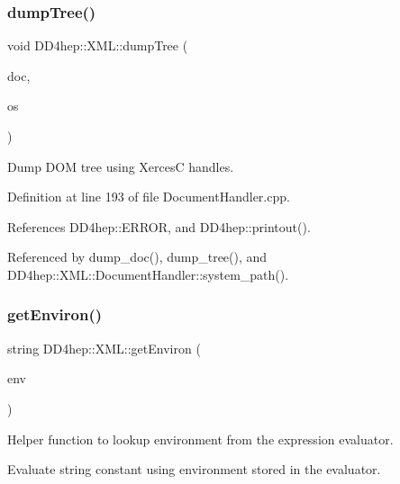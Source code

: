 \hypertarget{namespace_d_d4hep_1_1_x_m_l_a5378d08fbf2f2c9e495fc772360b62d8}{}\label{namespace_d_d4hep_1_1_x_m_l_a5378d08fbf2f2c9e495fc772360b62d8} 
\subsubsection{\texorpdfstring{dump\+Tree()}{dumpTree()}\hspace{0.1cm}{\footnotesize\ttfamily [2/2]}}
{\footnotesize\ttfamily void D\+D4hep\+::\+X\+M\+L\+::dump\+Tree (\begin{DoxyParamCaption}\item[{D\+O\+M\+Node $\ast$}]{doc,  }\item[{ostream \&}]{os }\end{DoxyParamCaption})}



Dump D\+OM tree using XercesC handles. 



Definition at line 193 of file Document\+Handler.\+cpp.



References D\+D4hep\+::\+E\+R\+R\+OR, and D\+D4hep\+::printout().



Referenced by dump\+\_\+doc(), dump\+\_\+tree(), and D\+D4hep\+::\+X\+M\+L\+::\+Document\+Handler\+::system\+\_\+path().

\hypertarget{namespace_d_d4hep_1_1_x_m_l_ab30d4d75e9d1cb30b2488b650836bdeb}{}\label{namespace_d_d4hep_1_1_x_m_l_ab30d4d75e9d1cb30b2488b650836bdeb} 
\subsubsection{\texorpdfstring{get\+Environ()}{getEnviron()}}
{\footnotesize\ttfamily string D\+D4hep\+::\+X\+M\+L\+::get\+Environ (\begin{DoxyParamCaption}\item[{const std\+::string \&}]{env }\end{DoxyParamCaption})}



Helper function to lookup environment from the expression evaluator. 

Evaluate string constant using environment stored in the evaluator. 

